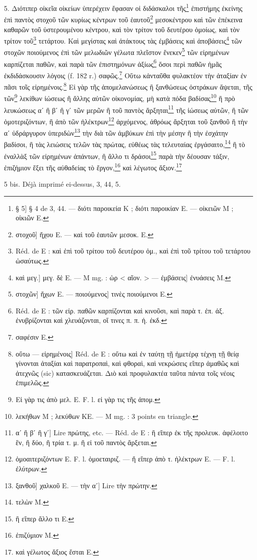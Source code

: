 \documentclass[a4paper, 11pt, oneside, polutonikogreek, french]{article}
\begin{document}
5. Διότιπερ οἰκεῖα οἰκείων ὑπερέχειν ἔφασαν οἱ διδάσκαλοι τῆς\footnote{§ 5] § 4 de 3, 44. --- διότι παροικεία Κ ; διότι παροικίαν E. --- οἰκειῶν M ; οἰκιῶν E.} ἐπιστήμης ἐκείνης ἐπὶ παντὸς στοχοῦ τῶν κυρίως κέντρων τοῦ ἑαυτοῦ\footnote{στοχοῦ] ἤχου E. --- καὶ τοῦ ἑαυτῶν μεσοκ. E.} μεσοκέντρου καὶ τῶν ἐπέκεινα καθαρῶν τοῦ ὑστερουμένου κέντρου, καὶ τὸν τρίτον τοῦ δευτέρου ὁμοίως, καὶ τὸν τρίτον τοῦ\footnote{Réd. de E : καὶ ἐπὶ τοῦ τρίτου τοῦ δευτέρου ὁμ., καὶ ἐπὶ τοῦ τρίτου τοῦ τετάρτου ὡσαύτως.} τετάρτου. Καὶ μεγίστας καὶ ἀτάκτους τὰς ἐμβάσεις καὶ ἀποβάσεις\footnote{καὶ μεγ.] μεγ. δὲ E. --- M mg. : ὡρ < αῖον. > --- ἐμβάσεις] ἐνυάσεις M.} τῶν στοχῶν ποιούμενος ἐπὶ τῶν μελωδιῶν γέλωτα πλεῖστον ἕνεκεν\footnote{στοχῶν] ἤχων E. --- ποιούμενος] τινὲς ποιούμενοι E.} τῶν εἰρημένων καρπίζεται παθῶν, καὶ παρὰ τῶν ἐπιστημόνων ἀξίως\footnote{Réd. de E : τῶν εἰρ. παθῶν καρπίζονται καὶ κινοῦσι, καὶ παρὰ τ. ἐπ. ἀξ. ἐνυβρίζονται καὶ χλευάζονται, οἵ τινες π. π. ἡ. ἐκδ.} ὅσοι περὶ παθῶν ἡμᾶς ἐκδιδάσκουσιν λόγοις (f. 182 r.) σαφῶς.\footnote{σαφέσιν E.} Οὕτω κἀνταῦθα φυλακτέον τὴν ἀταξίαν ἐν πᾶσι τοῖς εἰρημένοις.\footnote{οὕτω --- εἰρημένοις] Réd. de E : οὕτω καὶ ἐν ταύτῃ τῇ ἡμετέρᾳ τέχνῃ τῇ θείᾳ γίνονται ἀταξίαι καὶ παρατροπαὶ, καὶ φθοραὶ, καὶ νεκρώσεις εἴπερ ἀμαθῶς καὶ ἀτεχνῶς (sic) κατασκευάζεται. Διὸ καὶ προφυλακτέα ταῦτα πάντα τοῖς νέοις ἐπιμελῶς.} Εἰ γὰρ τῆς ἀπομελανώσεως ἢ ξανθώσεως ὀστράκων ἅψεται, τῆς τῶν\footnote{Εἰ γὰρ τις ἀπὸ μελ. E. F. l. εἰ γὰρ τις τῆς ἀπομ.} λεκίθων ἰώσεως ἢ ἄλλης αὐτῶν οἰκονομίας, μὴ κατὰ πόδα βαδίσας\footnote{λεκήθων M ; λεκύθων KE. --- M mg. : 3 points en triangle.} ἢ πρὸ λευκώσεως αʹ ἢ βʹ ἢ γʹ τῶν μερῶν ἢ τοῦ παντὸς ἄρξηται\footnote{αʹ ἢ βʹ ἢ γʹ] Lire πρώτης, etc. --- Réd. de E : ἢ εἴπερ ἐκ τῆς προλευκ. ἀφέλοιτο ἓν, ἢ δύο, ἢ τρία τ. μ. ἢ εἰ τοῦ παντὸς ἄρξεται.} τῆς ἰώσεως αὐτῶν, ἢ τῶν ὁμοτεριζόντων, ἢ ἀπὸ τῶν ἠλέκτρων\footnote{ὁμοαιτεριζόντων E. F. l. ὁμοεταιριζ. --- ἤ εἴπερ ἀπὸ τ. ἠλέκτρων E. --- F. l. ἐλύτρων.} ἀρχόμενος, ἀθρόως ἄρξηται τοῦ ξανθοῦ ἢ τὴν αʹ ὑδράργυρον ὑπεριδὼν\footnote{ξανθοῦ] χαλκοῦ E. --- τὴν αʹ] Lire τὴν πρώτην.} τὴν διὰ τῶν ἀμβύκων ἐπὶ τὴν μέσην ἢ τὴν ἐσχάτην βαδίσοι, ἢ τὰς λειώσεις τελῶν τὰς πρώτας, εὐθέως τὰς τελευταίας ἐργάσαιτο,\footnote{τελὼν M.} ἢ τὸ ἐναλλὰξ τῶν εἰρημένων ἁπάντων, ἢ ἄλλο τι δράσοι\footnote{ἢ εἴπερ ἄλλο τι E.} παρὰ τὴν δέουσαν τάξιν, ἐπιζήμιον ἕξει τῆς αὐθαδείας τὸ ἔργον,\footnote{ἐπιζύμιον M.} καὶ λέγωτος ἄξιον.\footnote{καὶ γέλωτος ἄξιος ἔσται E.}

5 bis. Déjà imprimé ei-dessus, 3, 44, 5.
\end{document}

